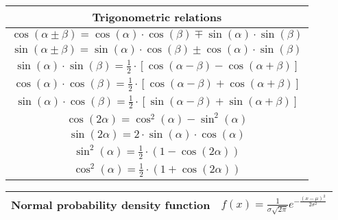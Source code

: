 \documentclass[en]{article}
\begin{document}
\renewcommand{\arraystretch}{1}

\begin{center}

    
    \vspace{0.5cm}

    \renewcommand{\arraystretch}{1.6}
    \begin{tabular}{|c|}
        \multicolumn{1}{c}{{\bf Trigonometric relations}}\\
        \hline 
        $\cos (\alpha \pm \beta) = \cos (\alpha) \cdot \cos (\beta) \mp \sin (\alpha) \cdot \sin (\beta)$ \\
        \hline 
        $\sin (\alpha \pm \beta) = \sin (\alpha) \cdot \cos (\beta) \pm \cos(\alpha) \cdot \sin (\beta)$ \\
        \hline 
        $\sin (\alpha) \cdot \sin (\beta) = \frac{1}{2} \cdot \left [ \cos (\alpha - \beta ) - \cos (\alpha + \beta ) \right ]$ \\ 
        \hline 
        $\cos (\alpha) \cdot \cos (\beta) = \frac{1}{2} \cdot \left [ \cos (\alpha - \beta ) + \cos (\alpha + \beta ) \right ]$ \\
        \hline 
        $\sin (\alpha) \cdot \cos (\beta) = \frac{1}{2} \cdot \left [ \sin (\alpha - \beta ) + \sin (\alpha + \beta ) \right ]$ \\ 
        \hline 
        $\cos (2 \alpha) = \cos^2 (\alpha) - \sin^2 (\alpha)$ \\ 
        \hline 
        $\sin (2 \alpha) = 2 \cdot \sin (\alpha) \cdot \cos (\alpha)$ \\
        \hline 
        $\sin^2 (\alpha) = \frac{1}{2} \cdot \left ( 1 - \cos (2 \alpha) \right )$ \\
        \hline 
        $\cos^2 (\alpha) = \frac{1}{2} \cdot \left ( 1 + \cos (2 \alpha) \right )$ \\
        \hline
    \end{tabular}
    \renewcommand{\arraystretch}{1}
    \vspace{0.5cm}

    \renewcommand{\arraystretch}{2}
        \begin{tabular}{|c|c|}
            \hline 
            Normal probability density function & $f(x) = \displaystyle\frac{1}{\sigma \sqrt{2 \pi}} e^{- \displaystyle\frac{(x - \mu)^2}{2 \sigma^2}}$ \\
            \hline
        \end{tabular}
    \renewcommand{\arraystretch}{1}
    \vspace{0.5cm}
    

\end{center}
\end{document}
